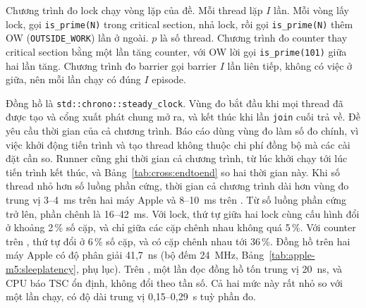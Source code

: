 
Chương trình đo lock chạy vòng lặp của đề. Mỗi thread lặp $I$ lần. Mỗi vòng lấy lock, gọi
\texttt{is\_prime(N)} trong critical section, nhả lock, rồi gọi \texttt{is\_prime(N)} thêm OW
(\texttt{OUTSIDE\_WORK}) lần ở ngoài. $p$ là số thread. Chương trình đo counter thay critical
section bằng một lần tăng counter, với OW lời gọi \texttt{is\_prime(101)} giữa hai lần tăng. Chương
trình đo barrier gọi barrier $I$ lần liên tiếp, không có việc ở giữa, nên mỗi lần chạy có đúng $I$
episode.

Đồng hồ là \texttt{std::chrono::steady\_clock}. Vùng đo bắt đầu khi mọi thread đã được tạo và cổng
xuất phát chung mở ra, và kết thúc khi lần \texttt{join} cuối trả về. Đề yêu cầu thời gian của cả
chương trình. Báo cáo dùng vùng đo làm số đo chính, vì việc khởi động tiến trình và tạo thread không
thuộc chi phí đồng bộ mà các cài đặt cần so. Runner cũng ghi thời gian cả chương trình, từ lúc khởi chạy
tới lúc tiến trình kết thúc, và Bảng~\ref{tab:cross:endtoend} so hai thời gian này. Khi số thread nhỏ
hơn số luồng phần cứng, thời gian cả chương trình dài hơn vùng đo trung vị 3--4~ms trên hai máy Apple và
8--10~ms trên . Từ số luồng phần cứng trở lên, phần chênh là 16--42~ms. Với lock, thứ tự
giữa hai lock cùng cấu hình đổi ở khoảng 2\,\% số cặp, và chỉ giữa các cặp chênh nhau không quá 5\,\%.
Với counter trên , thứ tự đổi ở 6\,\% số cặp, và có cặp chênh nhau tới 36\,\%.
Đồng hồ trên hai máy Apple có độ phân giải 41,7~ns (bộ đếm 24~MHz,
Bảng~\ref{tab:apple-m5:sleeplatency}, phụ lục).
Trên , một lần đọc đồng hồ tốn trung vị 20~ns, và CPU báo TSC ổn định, không đổi theo
tần số. Cả hai mức này rất nhỏ so với một lần chạy, có độ dài trung vị 0,15--0,29~s tuỳ phần đo.

